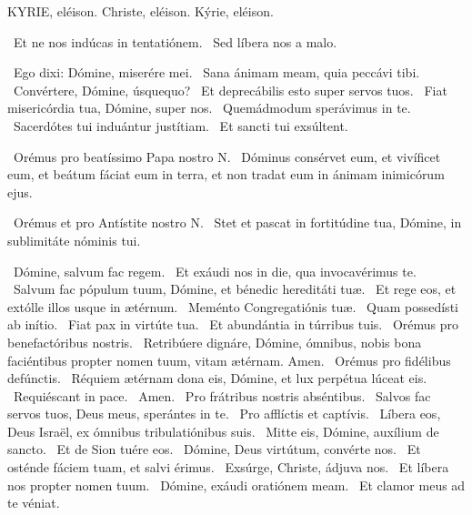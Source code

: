 
KYRIE, eléison. Christe, eléison. Kýrie, eléison.

 \V\ Et ne nos indúcas in tentatiónem. \R\ Sed líbera nos a malo.

\V\ Ego dixi: Dómine, miserére mei. \R\ Sana ánimam meam, quia peccávi tibi. \V\ Convértere, Dómine, úsquequo? \R\ Et deprecábilis esto super servos tuos. \V\ Fiat misericórdia tua, Dómine, super nos. \R\ Quemádmodum sperávimus in te. \V\ Sacerdótes tui induántur justítiam. \R\ Et sancti tui exsúltent.

\V\ Orémus pro beatíssimo Papa nostro N. \R\ Dóminus consérvet eum, et vivíficet eum, et beátum fáciat eum in terra, et non tradat eum in ánimam inimicórum ejus.

\V\ Orémus et pro Antístite nostro N. \R\ Stet et pascat in fortitúdine tua, Dómine, in sublimitáte nóminis tui.


\V\ Dómine, salvum fac regem. \R\ Et exáudi nos in die, qua invocavérimus te. \V\ Salvum fac pópulum tuum, Dómine, et bénedic hereditáti tuæ. \R\ Et rege eos, et extólle illos usque in ætérnum. \V\ Meménto Congregatiónis tuæ. \R\ Quam possedísti ab inítio. \V\ Fiat pax in virtúte tua. \R\ Et abundántia in túrribus tuis. \V\ Orémus pro benefactóribus nostris. \R\ Retribúere dignáre, Dómine, ómnibus, nobis bona faciéntibus propter nomen tuum, vitam ætérnam. Amen. \V\ Orémus pro fidélibus defúnctis. \R\ Réquiem ætérnam dona eis, Dómine, et lux perpétua lúceat eis. \V\ Requiéscant in pace. \R\ Amen. \V\ Pro frátribus nostris abséntibus. \R\ Salvos fac servos tuos, Deus meus, sperántes in te. \V\ Pro afflíctis et captívis. \R\ Líbera eos, Deus Israël, ex ómnibus tribulatiónibus suis. \V\ Mitte eis, Dómine, auxílium de sancto. \R\ Et de Sion tuére eos. \V\ Dómine, Deus virtútum, convérte nos. \R\ Et osténde fáciem tuam, et salvi érimus. \V\ Exsúrge, Christe, ádjuva nos. \R\ Et líbera nos propter nomen tuum. \V\ Dómine, exáudi oratiónem meam. \R\ Et clamor meus ad te véniat.

